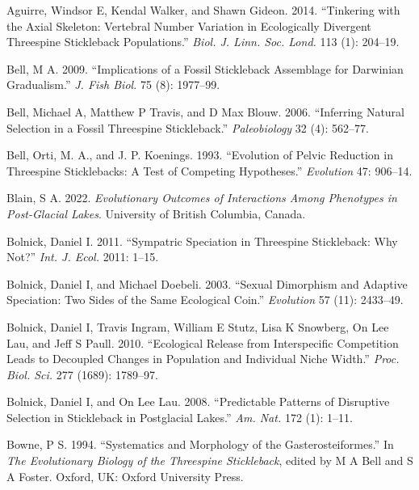 \documentclass[
  12pt,
]{article}
\newlength{\cslhangindent}
\newlength{\cslentryspacingunit} %
\newenvironment{CSLReferences}[2] %
 {%
  \setlength{\parindent}{0pt}
  \ifodd #1
  \let\oldpar\par
  \def\par{\hangindent=\cslhangindent\oldpar}
  \fi
  \setlength{\parskip}{#2\cslentryspacingunit}
 }%
 {}
\begin{document}
\begin{CSLReferences}{1}{0}
\leavevmode{}%
Aguirre, Windsor E, Kendal Walker, and Shawn Gideon. 2014. {``Tinkering
with the Axial Skeleton: Vertebral Number Variation in Ecologically
Divergent Threespine Stickleback Populations.''} \emph{Biol. J. Linn.
Soc. Lond.} 113 (1): 204--19.

\leavevmode{}%
Bell, M A. 2009. {``Implications of a Fossil Stickleback Assemblage for
Darwinian Gradualism.''} \emph{J. Fish Biol.} 75 (8): 1977--99.

\leavevmode{}%
Bell, Michael A, Matthew P Travis, and D Max Blouw. 2006. {``Inferring
Natural Selection in a Fossil Threespine Stickleback.''}
\emph{Paleobiology} 32 (4): 562--77.

\leavevmode{}%
Bell, Orti, M. A., and J. P. Koenings. 1993. {``Evolution of Pelvic
Reduction in Threespine Sticklebacks: A Test of Competing Hypotheses.''}
\emph{Evolution} 47: 906--14.

\leavevmode{}%
Blain, S A. 2022. \emph{Evolutionary Outcomes of Interactions Among
Phenotypes in Post-Glacial Lakes}. University of British Columbia,
Canada.

\leavevmode{}%
Bolnick, Daniel I. 2011. {``Sympatric Speciation in Threespine
Stickleback: Why Not?''} \emph{Int. J. Ecol.} 2011: 1--15.

\leavevmode{}%
Bolnick, Daniel I, and Michael Doebeli. 2003. {``Sexual Dimorphism and
Adaptive Speciation: Two Sides of the Same Ecological Coin.''}
\emph{Evolution} 57 (11): 2433--49.

\leavevmode{}%
Bolnick, Daniel I, Travis Ingram, William E Stutz, Lisa K Snowberg, On
Lee Lau, and Jeff S Paull. 2010. {``Ecological Release from
Interspecific Competition Leads to Decoupled Changes in Population and
Individual Niche Width.''} \emph{Proc. Biol. Sci.} 277 (1689): 1789--97.

\leavevmode{}%
Bolnick, Daniel I, and On Lee Lau. 2008. {``Predictable Patterns of
Disruptive Selection in Stickleback in Postglacial Lakes.''} \emph{Am.
Nat.} 172 (1): 1--11.

\leavevmode{}%
Bowne, P S. 1994. {``Systematics and Morphology of the
Gasterosteiformes.''} In \emph{The Evolutionary Biology of the
Threespine Stickleback}, edited by M A Bell and S A Foster. Oxford, UK:
Oxford University Press.


\end{CSLReferences}
\end{document}
